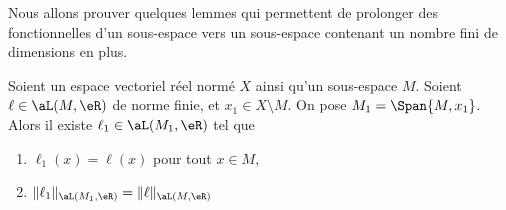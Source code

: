 Nous allons prouver quelques lemmes qui permettent de prolonger des fonctionnelles d'un sous-espace vers un sous-espace contenant un nombre fini de dimensions en plus.

\begin{lemma}     \label{LEMooHWSJooGVmIPV}
	Soient un espace vectoriel réel normé \( X\) ainsi qu'un sous-espace \( M\). Soient \( \ell\in\aL(M,\eR)\) de norme finie, et \( x_1\in X\setminus M\). On pose \( M_1=\Span\{ M, x_1 \}\). Alors il existe \( \ell_1\in\aL(M_1,\eR)\) tel que
	\begin{enumerate}
		\item
		      \( \ell_1(x)=\ell(x)\) pour tout \( x\in M\),
		\item
		      \( \| \ell_1 \|_{\aL(M_1,\eR)}=\| \ell \|_{\aL(M,\eR)}\)
	\end{enumerate}
\end{lemma}

